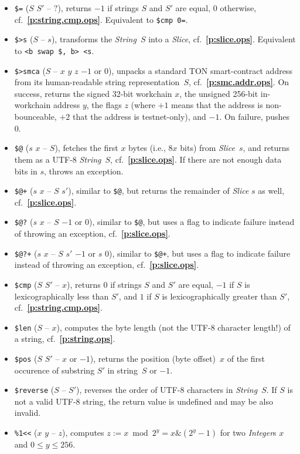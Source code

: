 \documentclass[12pt,oneside]{article}
\def\refpoint#1{{\rm\textbf{\ref{#1}}}}
\let\ptref=\refpoint
\begin{document}
\begin{itemize}
\item {\tt \$=} ($S$ $S'$ -- $?$), returns $-1$ if strings $S$ and $S'$ are equal, $0$ otherwise, cf.~\ptref{p:string.cmp.ops}. Equivalent to {\tt \$cmp 0=}.
\item {\tt \$>s} ($S$ -- $s$), transforms the {\em String\/}~$S$ into a {\em Slice}, cf.~\ptref{p:slice.ops}. Equivalent to {\tt <b swap \$, b> <s}.
\item {\tt \$>smca} ($S$ -- $x$ $y$ $z$ $-1$ or $0$), unpacks a standard TON smart-contract address from its human-readable string representation~$S$, cf.~\ptref{p:smc.addr.ops}. On success, returns the signed 32-bit workchain $x$, the unsigned 256-bit in-workchain address $y$, the flags $z$ (where $+1$ means that the address is non-bounceable, $+2$ that the address is testnet-only), and $-1$. On failure, pushes $0$.
\item {\tt \$@} ($s$ $x$ -- $S$), fetches the first $x$ bytes (i.e., $8x$ bits) from {\em Slice}~$s$, and returns them as a UTF-8 {\em String\/}~$S$, cf.~\ptref{p:slice.ops}. If there are not enough data bits in $s$, throws an exception.
\item {\tt \$@+} ($s$ $x$ -- $S$ $s'$), similar to {\tt \$@}, but returns the remainder of {\em Slice\/} $s$ as well, cf.~\ptref{p:slice.ops}.
\item {\tt \$@?} ($s$ $x$ -- $S$ $-1$ or $0$), similar to {\tt \$@}, but uses a flag to indicate failure instead of throwing an exception, cf.~\ptref{p:slice.ops}.
\item {\tt \$@?+} ($s$ $x$ -- $S$ $s'$ $-1$ or $s$ $0$), similar to {\tt \$@+}, but uses a flag to indicate failure instead of throwing an exception, cf.~\ptref{p:slice.ops}.
\item {\tt \$cmp} ($S$ $S'$ -- $x$), returns $0$ if strings $S$ and $S'$ are equal, $-1$ if $S$ is lexicographically less than $S'$, and $1$ if $S$ is lexicographically greater than $S'$, cf.~\ptref{p:string.cmp.ops}.
\item {\tt \$len} ($S$ -- $x$), computes the byte length (not the UTF-8 character length!) of a string, cf.~\ptref{p:string.ops}.
\item {\tt \$pos} ($S$ $S'$ -- $x$ or $-1$), returns the position (byte offset)~$x$ of the first occurence of substring $S'$ in string~$S$ or $-1$.
\item {\tt \$reverse} ($S$ -- $S'$), reverses the order of UTF-8 characters in {\em String\/}~$S$. If $S$ is not a valid UTF-8 string, the return value is undefined and may be also invalid.
\item {\tt \%1<{<}} ($x$ $y$ -- $z$), computes $z:=x\bmod 2^y=x\&(2^y-1)$ for two {\em Integer\/}s $x$ and $0\leq y\leq 256$.

\end{itemize}
\end{document}
